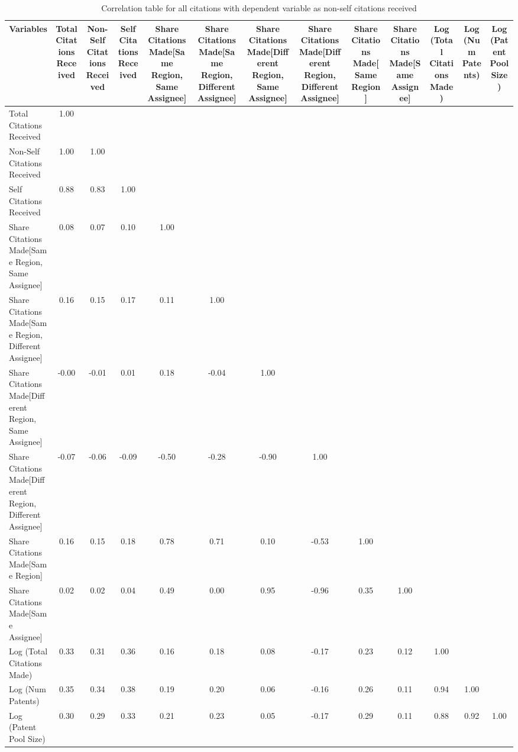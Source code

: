 \begin{table}[htbp]\centering \caption{Correlation table for all citations  with dependent variable as non-self citations received\label{a.e.o.t.n.ncorrelation}}
\begin{tabular}{l  c  c  c  c  c  c  c  c  c  c  c  c }\hline\hline
\multicolumn{1}{c}{Variables} &Total Citations Received&Non-Self Citations Received&Self Citations Received&Share Citations Made[Same Region, Same Assignee]&Share Citations Made[Same Region, Different Assignee]&Share Citations Made[Different Region, Same Assignee]&Share Citations Made[Different Region, Different Assignee]&Share Citations Made[Same Region]&Share Citations Made[Same Assignee]&Log (Total Citations Made)&Log (Num Patents)&Log (Patent Pool Size)\\ \hline
Total Citations Received&1.00\\
Non-Self Citations Received&1.00&1.00\\
Self Citations Received&0.88&0.83&1.00\\
Share Citations Made[Same Region, Same Assignee]&0.08&0.07&0.10&1.00\\
Share Citations Made[Same Region, Different Assignee]&0.16&0.15&0.17&0.11&1.00\\
Share Citations Made[Different Region, Same Assignee]&-0.00&-0.01&0.01&0.18&-0.04&1.00\\
Share Citations Made[Different Region, Different Assignee]&-0.07&-0.06&-0.09&-0.50&-0.28&-0.90&1.00\\
Share Citations Made[Same Region]&0.16&0.15&0.18&0.78&0.71&0.10&-0.53&1.00\\
Share Citations Made[Same Assignee]&0.02&0.02&0.04&0.49&0.00&0.95&-0.96&0.35&1.00\\
Log (Total Citations Made)&0.33&0.31&0.36&0.16&0.18&0.08&-0.17&0.23&0.12&1.00\\
Log (Num Patents)&0.35&0.34&0.38&0.19&0.20&0.06&-0.16&0.26&0.11&0.94&1.00\\
Log (Patent Pool Size)&0.30&0.29&0.33&0.21&0.23&0.05&-0.17&0.29&0.11&0.88&0.92&1.00\\
\hline \hline 
 \end{tabular}
\end{table}
